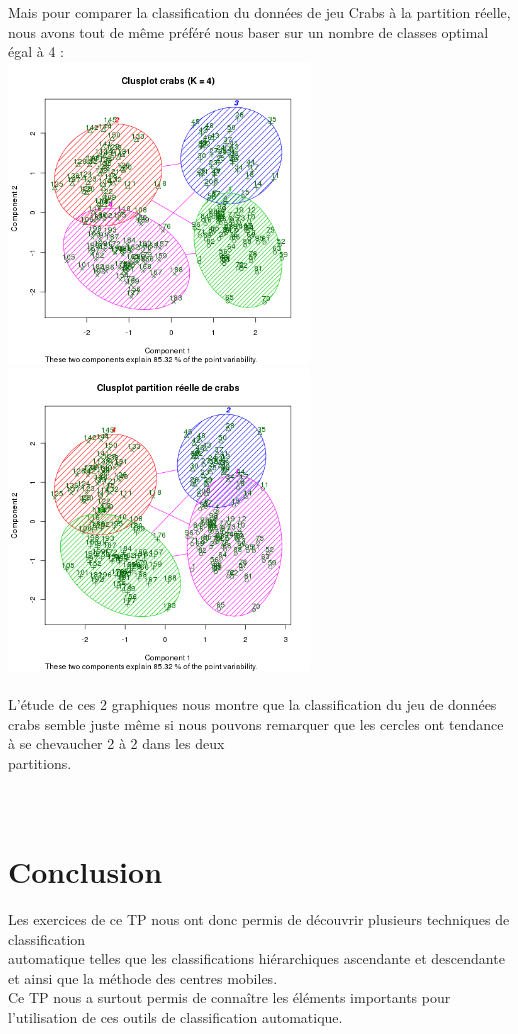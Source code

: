 \documentclass[a4paper, 10pt]{article}
\begin{document}
Mais pour comparer la classification du donn\'ees de jeu Crabs \`a la partition r\'eelle, nous avons tout de m\^eme pr\'ef\'er\'e nous baser
sur un nombre de classes optimal \'egal \`a 4 :\\
\includegraphics[height = 8cm, width = 8cm]{plots/clusplot_crabs_12.png}
\includegraphics[height = 8cm, width = 8cm]{plots/clusplot_crabs_13.png}\\ \\
L'\'etude de ces 2 graphiques nous montre que la classification du jeu de donn\'ees crabs semble juste m\^eme si nous pouvons remarquer
que les cercles ont tendance \`a se chevaucher 2 \`a 2 dans les deux\\partitions.\\ \\ \\

\section*{Conclusion}
Les exercices de ce TP nous ont donc permis de d\'ecouvrir plusieurs techniques de classification\\automatique telles que
les classifications hi\'erarchiques ascendante et descendante et ainsi que la m\'ethode des centres mobiles.\\
Ce TP nous a surtout permis de conna\^itre les \'el\'ements importants pour l'utilisation de ces outils de classification automatique.
\end{document}
